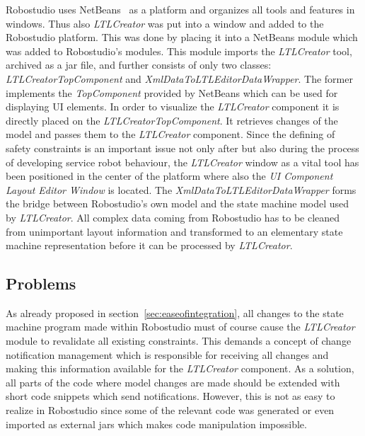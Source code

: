 Robostudio uses NetBeans~\cite{netbeans} as a platform and organizes all tools and features in windows. Thus also \emph{LTLCreator} was put into a window and added to the Robostudio platform. This was done by placing it into a NetBeans module which was added to Robostudio's modules. This module imports the \emph{LTLCreator} tool, archived as a jar file, and further consists of only two classes: \emph{LTLCreatorTopComponent} and \emph{XmlDataToLTLEditorDataWrapper}. The former implements the \emph{TopComponent} provided by NetBeans which can be used for displaying UI elements. In order to visualize the \emph{LTLCreator} component it is directly placed on the \emph{LTLCreatorTopComponent}. It retrieves changes of the model and passes them to the \emph{LTLCreator} component. Since the defining of safety constraints is an important issue not only after but also during the process of developing service robot behaviour, the \emph{LTLCreator} window as a vital tool has been positioned in the center of the platform where also the \emph{UI Component Layout Editor Window} is located.
The \emph{XmlDataToLTLEditorDataWrapper} forms the bridge between Robostudio's own model and the state machine model used by \emph{LTLCreator}. All complex data coming from Robostudio has to be cleaned from unimportant layout information and transformed to an elementary state machine representation before it can be processed by \emph{LTLCreator}.






\subsection{Problems}

As already proposed in section~\ref{sec:easeofintegration}, all changes to the state machine program made within Robostudio must of course cause the \emph{LTLCreator} module to revalidate all existing constraints. This demands a concept of change notification management which is responsible for receiving all changes and making this information available for the \emph{LTLCreator} component. As a solution, all parts of the code where model changes are made should be extended with short code snippets which send notifications.
However, this is not as easy to realize in Robostudio since some of the relevant code was generated or even imported as external jars which makes code manipulation impossible.

